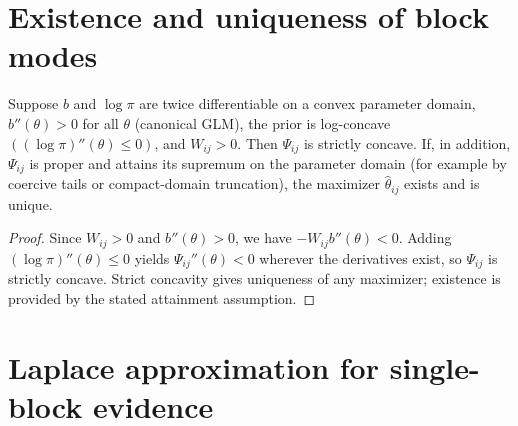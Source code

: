 \section{Existence and uniqueness of block modes}

\begin{lemma}
\label{lem:concave-unique}
Suppose $b$ and $\log\pi$ are twice differentiable on a convex parameter domain,
$b''(\theta)>0$ for all $\theta$ (canonical GLM), the prior is log-concave
$((\log\pi)''(\theta)\le 0)$, and $W_{ij}>0$. Then $\Psi_{ij}$ is strictly concave. If, in
addition, $\Psi_{ij}$ is proper and attains its supremum on the parameter domain (for example by
coercive tails or compact-domain truncation), the maximizer $\hat\theta_{ij}$ exists and is unique.
\end{lemma}

\begin{proof}
Since $W_{ij}>0$ and $b''(\theta)>0$, we have $-W_{ij}b''(\theta)<0$. Adding
$(\log\pi)''(\theta)\le 0$ yields $\Psi_{ij}''(\theta)<0$ wherever the derivatives exist, so
$\Psi_{ij}$ is strictly concave. Strict concavity gives uniqueness of any maximizer; existence is
provided by the stated attainment assumption.
\end{proof}

\section{Laplace approximation for single-block evidence}


